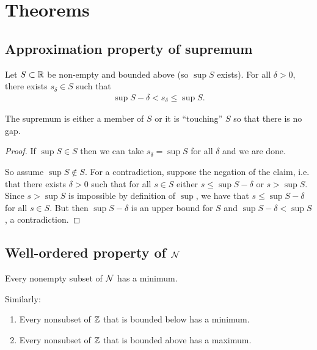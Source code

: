 \section{Theorems}

\subsection{Approximation property of supremum}
\begin{theorem*}
  Let $S \subset \mathbb{R}$ be non-empty and bounded above (so $\sup S$ exists). For all $\delta > 0$,
  there exists $s_\delta \in S$ such that
  \begin{align*}
    \sup S - \delta < s_\delta \leq \sup S.
  \end{align*}
  \begin{intuition*}
    The supremum is either a member of $S$ or it is ``touching'' $S$ so that there is no gap.
  \end{intuition*}
  \begin{proof}
    If $\sup S \in S$ then we can take $s_\delta = \sup S$ for all $\delta$ and we are done.

    So assume $\sup S \not\in S$. For a contradiction, suppose the negation of the claim, i.e. that
    there exists $\delta > 0$ such that for all $s \in S$ either $s \leq \sup S - \delta$ or
    $s > \sup S$. Since $s > \sup S$ is impossible by definition of $\sup$, we have that
    $s \leq \sup S - \delta$ for all $s \in S$. But then $\sup S - \delta$ is an upper bound for
    $S$ and $\sup S - \delta < \sup S$, a contradiction.
  \end{proof}
\end{theorem*}

\subsection{Well-ordered property of $\mathcal{N}$}
\begin{theorem*}\hspace{0pt}
  Every nonempty subset of $\mathcal{N}$ has a minimum.
\end{theorem*}

\begin{remark*}
  Similarly:
  \begin{enumerate}
    \item Every nonsubset of $\mathbb{Z}$ that is bounded below has a minimum.
    \item Every nonsubset of $\mathbb{Z}$ that is bounded above has a maximum.
  \end{enumerate}
\end{remark*}

